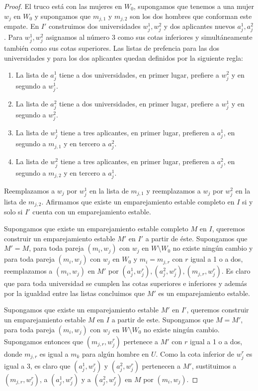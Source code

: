\begin{proof}
El truco está con las mujeres en $W_0$, supongamos que tenemos a una mujer $w_j$ en $W_0$ y supongamos que $m_{j,1} $ y $m_{j,2}$ son los dos hombres que conforman este empate. En $I'$ construimos dos universidades $w_j^{1}, w_{j}^2$ y dos aplicantes nuevos $a_j^1, a_j^2$. Para $w_j^{1}, w_{j}^2$ asignamos al número 3 como sus cotas inferiores y simultáneamente también como sus cotas superiores. Las listas de prefencia para las dos universidades y para los dos aplicantes quedan definidos por la siguiente regla:
\begin{enumerate}
\item La lista de $a_j^1$ tiene a dos universidades, en primer lugar, prefiere a $w_j^2$ y en segundo a $w_j^1$.
\item La lista de $a_j^2$ tiene a dos universidades, en primer lugar, prefiere a $w_j^1$ y en segundo a $w_j^2$.
\item La lista de $w_j^1$ tiene a tres aplicantes, en primer lugar, prefieren a $a_j^1$, en segundo a $m_{j,1}$ y en tercero a $a_j^2$.
\item La lista de $w_j^2$ tiene a tres aplicantes, en primer lugar, prefieren a $a_j^2$, en segundo a $m_{j,2}$ y en tercero a $a_j^1$.
\end{enumerate}

Reemplazamos a $w_j$ por $w_j^1$ en la lista de $m_{j,1}$ y reemplazamos a $w_j$ por $w_j^2$ en la lista de $m_{j,2}$. Afirmamos que existe un emparejamiento estable completo en $I$ si y solo si $I'$ cuenta con un emparejamiento estable. 

Supongamos que existe un emparejamiento estable completo $M$ en $I$, queremos construir un emparejamiento estable $M'$ en $I'$ a partir de éste. Supongamos que $M'=M$, para toda pareja $(m_i,w_j)$ con $w_j$ en $W\setminus W_0$ no existe ningún cambio y para toda pareja $(m_i,w_j)$ con $w_j$ en $W_0$ y $m_i=m_{j,r}$ con $r$ igual a 1 o a dos, reemplazamos a $(m_i,w_j)$ en $M'$ por $(a_j^1,w_j^r), (a_j^2,w_j^r),(m_{j,r}, w_j^r)$. Es claro que para toda universidad se cumplen las cotas superiores e inferiores y además por la igualdad entre las listas concluimos que $M'$ es un emparejamiento estable. 

Supongamos que existe un emparejamiento estable $M'$ en $I'$, queremos construir un emparejamiento estable $M$ en $I$ a partir de este. Supongamos que $M=M'$, para toda pareja $(m_i,w_j)$ con $w_j$ en $W\setminus W_0$ no existe ningún cambio. Supongamos entonces que $(m_{j,r}, w_{j}^{r})$ pertenece a $M'$ con $r$ igual a 1 o a dos, donde $m_{j,r}$ es igual a $m_k$ para algún hombre en $U$. Como la cota inferior de $w_{j}^{r}$ es igual a 3, es claro que $(a_j^1,w_{j}^{r})$ y $(a_j^2,w_{j}^{r})$ pertenecen a $M'$, sustituimos a $(m_{j,r}, w_{j}^{r})$, a $(a_j^1,w_{j}^{r})$ y a $(a_j^2,w_{j}^{r})$ en $M$ por $(m_i,w_j)$.


\end{proof}
